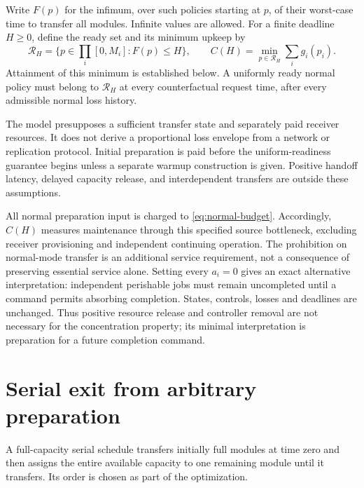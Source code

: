 Write \(F(p)\) for the infimum, over such policies starting at \(p\), of their
worst-case time to transfer all modules. Infinite values are allowed. For a
finite deadline \(H\geq0\), define the ready set and its minimum upkeep by
\begin{equation}
 \mathcal R_H=\{p\in\textstyle\prod_i[0,M_i]:F(p)\leq H\},
 \qquad
 C(H)=\min_{p\in\mathcal R_H}\sum_i g_i(p_i).
 \label{eq:readiness-cost}
\end{equation}
Attainment of this minimum is established below. A uniformly ready normal
policy must belong to \(\mathcal R_H\) at every counterfactual request time,
after every admissible normal loss history.

The model presupposes a sufficient transfer state and separately paid
receiver resources. It does not derive a proportional loss envelope from a
network or replication protocol. Initial preparation is paid before the
uniform-readiness guarantee begins unless a separate warmup construction is
given. Positive handoff latency, delayed capacity release, and interdependent
transfers are outside these assumptions.

All normal preparation input is charged to \eqref{eq:normal-budget}.
Accordingly, $C(H)$ measures maintenance through this specified source
bottleneck, excluding receiver provisioning and independent continuing
operation. The prohibition on normal-mode transfer is an additional service
requirement, not a consequence of preserving essential service alone.
Setting every $a_i=0$ gives an exact alternative interpretation: independent
perishable jobs must remain uncompleted until a command permits absorbing
completion. States, controls, losses and deadlines are unchanged. Thus
positive resource release and controller removal are not necessary for the
concentration property; its minimal interpretation is preparation for a
future completion command.

\section{Serial exit from arbitrary preparation}
\label{sec:seriality}

A full-capacity serial schedule transfers initially full modules at time zero
and then assigns the entire available capacity to one remaining module until
it transfers. Its order is chosen as part of the optimization.

